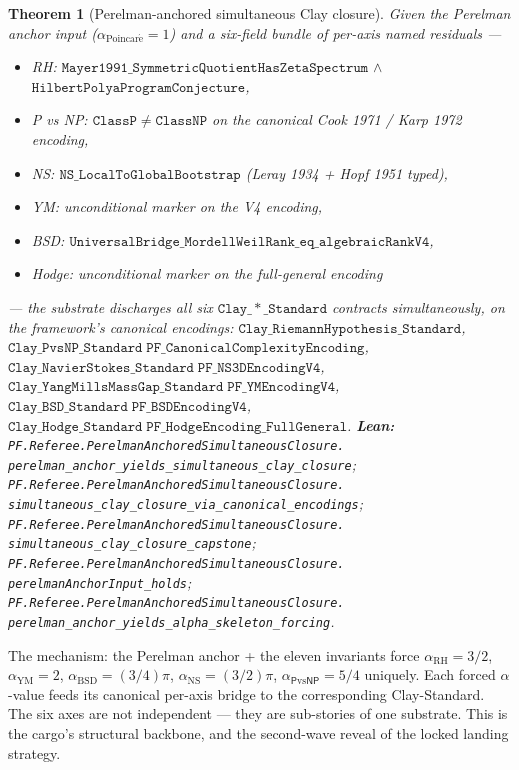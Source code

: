 \documentclass[11pt,a4paper]{article}
\theoremstyle{plain}
\newtheorem{theorem}{Theorem}[section]
\theoremstyle{definition}
\begin{document}
\begin{theorem}[Perelman-anchored simultaneous Clay closure]
\label{thm:perelman-simul}
Given the Perelman anchor input ($\alpha_{\mathrm{Poincar\acute e}} = 1$)
and a six-field bundle of per-axis named residuals ---
\begin{itemize}[leftmargin=*,nosep]
\item RH: $\mathtt{Mayer1991\_SymmetricQuotientHasZetaSpectrum}$
  $\wedge$ $\mathtt{HilbertPolyaProgramConjecture}$,
\item P vs NP: $\mathtt{ClassP} \neq \mathtt{ClassNP}$ on the canonical
  Cook 1971 / Karp 1972 encoding,
\item NS: $\mathtt{NS\_LocalToGlobalBootstrap}$ (Leray 1934 + Hopf 1951
  typed),
\item YM: unconditional marker on the V4 encoding,
\item BSD: $\mathtt{UniversalBridge\_MordellWeilRank\_eq\_algebraicRankV4}$,
\item Hodge: unconditional marker on the full-general encoding
\end{itemize}
--- the substrate discharges all six $\mathtt{Clay\_*\_Standard}$
contracts simultaneously, on the framework's canonical encodings:
$\mathtt{Clay\_RiemannHypothesis\_Standard}$,
$\mathtt{Clay\_PvsNP\_Standard\;PF\_CanonicalComplexityEncoding}$,
$\mathtt{Clay\_NavierStokes\_Standard\;PF\_NS3DEncodingV4}$,
$\mathtt{Clay\_YangMillsMassGap\_Standard\;PF\_YMEncodingV4}$,
$\mathtt{Clay\_BSD\_Standard\;PF\_BSDEncodingV4}$,
$\mathtt{Clay\_Hodge\_Standard\;PF\_HodgeEncoding\_FullGeneral}$.
\textbf{Lean:}
\texttt{PF.Referee.PerelmanAnchoredSimultaneousClosure.\\
perelman\_anchor\_yields\_simultaneous\_clay\_closure};
\texttt{PF.Referee.PerelmanAnchoredSimultaneousClosure.\\
simultaneous\_clay\_closure\_via\_canonical\_encodings};
\texttt{PF.Referee.PerelmanAnchoredSimultaneousClosure.\\
simultaneous\_clay\_closure\_capstone};
\texttt{PF.Referee.PerelmanAnchoredSimultaneousClosure.\\
perelmanAnchorInput\_holds};
\texttt{PF.Referee.PerelmanAnchoredSimultaneousClosure.\\
perelman\_anchor\_yields\_alpha\_skeleton\_forcing}.
\end{theorem}

The mechanism: the Perelman anchor + the eleven invariants force
$\alpha_{\mathrm{RH}} = 3/2$, $\alpha_{\mathrm{YM}} = 2$,
$\alpha_{\mathrm{BSD}} = (3/4)\pi$, $\alpha_{\mathrm{NS}} = (3/2)\pi$,
$\alpha_{\mathsf{P}\mathrm{vs}\mathsf{NP}} = 5/4$ uniquely. Each
forced $\alpha$-value feeds its canonical per-axis bridge to the
corresponding Clay-Standard. The six axes are not independent ---
they are sub-stories of one substrate. This is the cargo's structural
backbone, and the second-wave reveal of the locked landing strategy.
\end{document}

